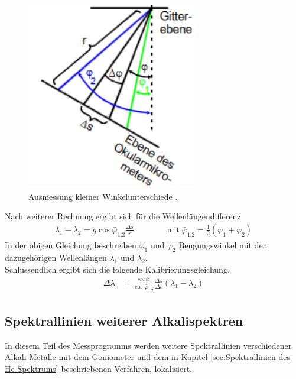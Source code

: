 \begin{figure}
  \centering
  \includegraphics{ressources/delta_s.pdf}
  \caption{Ausmessung  kleiner Winkelunterschiede \cite{skript}.}
  \label{fig:Winkelunterschied}
\end{figure}

Nach weiterer Rechnung ergibt sich für die Wellenlängendifferenz
\begin{align}
  \lambda_1 - \lambda_2 = g \cos{\bar{\varphi}_\textrm{1,2}\frac{\Delta s}{r}} \qquad \qquad \text{mit} \;  \bar{\varphi}_\textrm{1,2} = \frac{1}{2}(\varphi_1 + \varphi_2)
\end{align}
In der obigen Gleichung beschreiben $\varphi_1$ und $\varphi_2$ Beugungswinkel mit den dazugehörigen Wellenlängen $\lambda_1$ und $\lambda_2$.\\
Schlussendlich ergibt sich die folgende Kalibrierungsgleichung.
\begin{align}
  \Delta \lambda &= \frac{cos{\bar{\varphi}}}{\cos{\bar{\varphi}}_\textrm{1,2}} \frac{\Delta s}{\Delta t} (\lambda_1 - \lambda_2) 
  \label{eq:deltalambda}
\end{align}


\subsection{Spektrallinien weiterer Alkalispektren}

In diesem Teil des Messprogramms werden weitere Spektrallinien verschiedener Alkali-Metalle mit dem  Goniometer und dem in Kapitel \ref{sec:Spektrallinien des He-Spektrums} beschriebenen Verfahren, lokalisiert.\\

